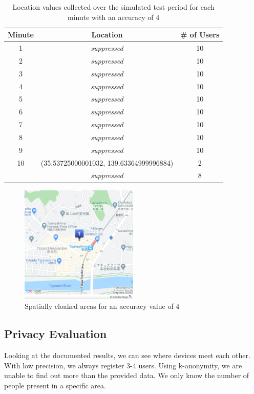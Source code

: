 \begin{table}[htbp]
	\centering
	\begin{tabular}{|c|c|c|} 
		\hline
		\textbf{Minute} & \textbf{Location} & \textbf{\# of Users}\\ [0.5ex] 
		\hline
		1 & \textit{suppressed} & 10 \\
		\hline
		2 &\textit{suppressed} & 10 \\
		\hline
		3 &\textit{suppressed} & 10 \\
		\hline
		4 &\textit{suppressed} & 10 \\
		\hline
		5 &\textit{suppressed} & 10 \\
		\hline
		6 &\textit{suppressed} & 10 \\
		\hline
		7 &\textit{suppressed} & 10 \\
		\hline
		8 &\textit{suppressed} & 10 \\
		\hline
		9 &\textit{suppressed} & 10 \\
		\hline
		10 & (35.53725000001032, 139.63364999996884) & 2 \\ 
		&\textit{suppressed} & 8 \\ 
		\hline
	\end{tabular}
	\caption{Location values collected over the simulated test period for each minute with an accuracy of 4}
	\label{tab:location_sim4}
\end{table}

\begin{figure}[htbp]
  \centering
  \includegraphics[width=0.5\textwidth]{figures/acc4}
  \caption{Spatially cloaked areas for an accuracy value of 4} \label{fig:acc4}
\end{figure}

\subsection{Privacy Evaluation}
Looking at the documented results, we can see where devices meet each other. With low precision, we always register 3-4 users. Using k-anonymity, we are unable to find out more than the provided data. We only know the number of people present in a specific area. 

